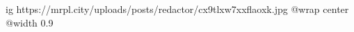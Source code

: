  
 
 
 
 

\ifcmt
  ig https://mrpl.city/uploads/posts/redactor/cx9tlxw7xxflaoxk.jpg
  @wrap center
  @width 0.9
\fi
